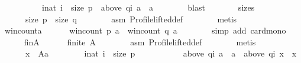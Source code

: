 \begin{isabellebody}
\ \ \ \ \ \ \ \ \ \ {\isacharbraceleft}{\kern0pt}i{\isacharcolon}{\kern0pt}{\isacharcolon}{\kern0pt}nat{\isachardot}{\kern0pt}\ i\ {\isacharless}{\kern0pt}\ size\ p\ {\isasymand}\ above\ {\isacharparenleft}{\kern0pt}q{\isacharbang}{\kern0pt}i{\isacharparenright}{\kern0pt}\ a\ {\isacharequal}{\kern0pt}\ {\isacharbraceleft}{\kern0pt}a{\isacharbraceright}{\kern0pt}{\isacharbraceright}{\kern0pt}{\isachardoublequoteclose}\isanewline
\ \ \ \ \ \ \isamarkupfalse%
\ blast\isanewline
\ \ \ \ \isamarkupfalse%
\ \isamarkupfalse%
\ sizes{\isacharcolon}{\kern0pt}\isanewline
\ \ \ \ \ \ {\isachardoublequoteopen}size\ p\ {\isacharequal}{\kern0pt}\ size\ q{\isachardoublequoteclose}\isanewline
\ \ \ \ \ \ \isamarkupfalse%
\ asm{}\ Profile{\isachardot}{\kern0pt}lifted{\isacharunderscore}{\kern0pt}def\isanewline
\ \ \ \ \ \ \isamarkupfalse%
\ metis\isanewline
\ \ \ \ \isamarkupfalse%
\ \isamarkupfalse%
\ win{\isacharunderscore}{\kern0pt}count{\isacharunderscore}{\kern0pt}a{\isacharcolon}{\kern0pt}\isanewline
\ \ \ \ \ \ {\isachardoublequoteopen}win{\isacharunderscore}{\kern0pt}count\ p\ a\ {\isasymle}\ win{\isacharunderscore}{\kern0pt}count\ q\ a{\isachardoublequoteclose}\isanewline
\ \ \ \ \ \ \isamarkupfalse%
\ {\isacharparenleft}{\kern0pt}simp\ add{\isacharcolon}{\kern0pt}\ card{\isacharunderscore}{\kern0pt}mono{\isacharparenright}{\kern0pt}\isanewline
\ \ \ \ \isamarkupfalse%
\ fin{\isacharunderscore}{\kern0pt}A{\isacharcolon}{\kern0pt}\isanewline
\ \ \ \ \ \ {\isachardoublequoteopen}finite\ A{\isachardoublequoteclose}\isanewline
\ \ \ \ \ \ \isamarkupfalse%
\ asm{}\ Profile{\isachardot}{\kern0pt}lifted{\isacharunderscore}{\kern0pt}def\isanewline
\ \ \ \ \ \ \isamarkupfalse%
\ metis\isanewline
\ \ \ \ \isamarkupfalse%
\isanewline
\ \ \ \ \ \ {\isachardoublequoteopen}{\isasymforall}x\ {\isasymin}\ A{\isacharminus}{\kern0pt}{\isacharbraceleft}{\kern0pt}a{\isacharbraceright}{\kern0pt}{\isachardot}{\kern0pt}\isanewline
\ \ \ \ \ \ \ \ {\isasymforall}i{\isacharcolon}{\kern0pt}{\isacharcolon}{\kern0pt}nat{\isachardot}{\kern0pt}\ i\ {\isacharless}{\kern0pt}\ size\ p\ {\isasymlongrightarrow}\isanewline
\ \ \ \ \ \ \ \ \ \ {\isacharparenleft}{\kern0pt}above\ {\isacharparenleft}{\kern0pt}q{\isacharbang}{\kern0pt}i{\isacharparenright}{\kern0pt}\ a\ {\isacharequal}{\kern0pt}\ {\isacharbraceleft}{\kern0pt}a{\isacharbraceright}{\kern0pt}\ {\isasymlongrightarrow}\ above\ {\isacharparenleft}{\kern0pt}q{\isacharbang}{\kern0pt}i{\isacharparenright}{\kern0pt}\ x\ {\isasymnoteq}\ {\isacharbraceleft}{\kern0pt}x{\isacharbraceright}{\kern0pt}{\isacharparenright}{\kern0pt}{\isachardoublequoteclose}\isanewline

\end{isabellebody}
